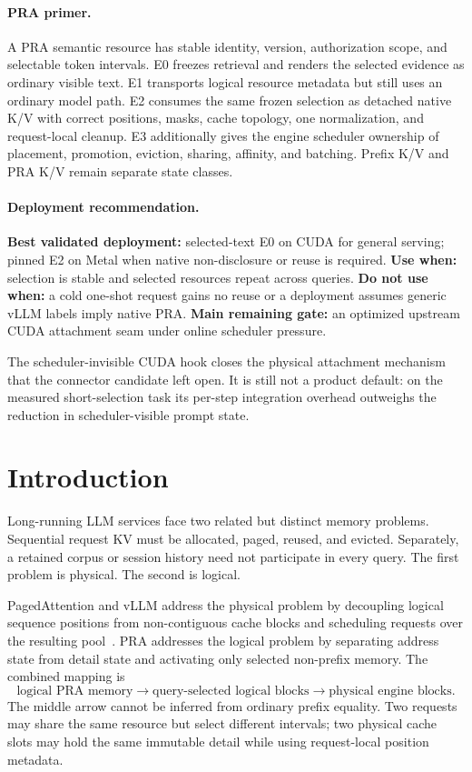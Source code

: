 \documentclass[10pt]{article}
\begin{document}
\paragraph{PRA primer.}
A PRA semantic resource has stable identity, version, authorization scope, and
selectable token intervals. E0 freezes retrieval and renders the selected
evidence as ordinary visible text. E1 transports logical resource metadata but
still uses an ordinary model path. E2 consumes the same frozen selection as
detached native K/V with correct positions, masks, cache topology, one
normalization, and request-local cleanup. E3 additionally gives the engine
scheduler ownership of placement, promotion, eviction, sharing, affinity, and
batching. Prefix K/V and PRA K/V remain separate state classes.

\paragraph{Deployment recommendation.}
\textbf{Best validated deployment:} selected-text E0 on CUDA for general
serving; pinned E2 on Metal when native non-disclosure or reuse is required.
\textbf{Use when:} selection is stable and selected resources repeat across
queries. \textbf{Do not use when:} a cold one-shot request gains no reuse or a
deployment assumes generic vLLM labels imply native PRA. \textbf{Main remaining
gate:} an optimized upstream CUDA attachment seam under online scheduler pressure.

The scheduler-invisible CUDA hook closes the physical attachment mechanism that
the connector candidate left open. It is still not a product default: on the
measured short-selection task its per-step integration overhead outweighs the
reduction in scheduler-visible prompt state.

\section{Introduction}
Long-running LLM services face two related but distinct memory problems.
Sequential request KV must be allocated, paged, reused, and evicted. Separately,
a retained corpus or session history need not participate in every query. The
first problem is physical. The second is logical.

PagedAttention and vLLM address the physical problem by decoupling logical
sequence positions from non-contiguous cache blocks and scheduling requests
over the resulting pool~\cite{kwon2023vllm}. PRA addresses the logical problem
by separating address state from detail state and activating only selected
non-prefix memory. The combined mapping is
\[
  \text{logical PRA memory}
  \rightarrow \text{query-selected logical blocks}
  \rightarrow \text{physical engine blocks}.
\]
The middle arrow cannot be inferred from ordinary prefix equality. Two requests
may share the same resource but select different intervals; two physical cache
slots may hold the same immutable detail while using request-local position
metadata.
\end{document}
